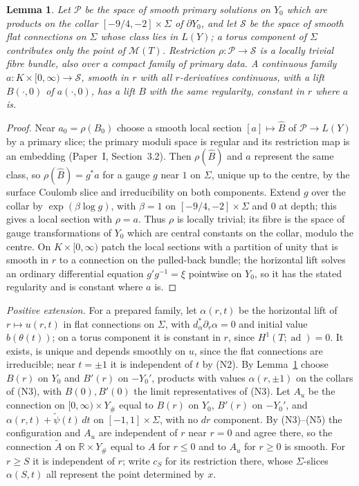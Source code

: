 \documentclass[11pt]{amsart}
\newtheorem{lemma}[theorem]{Lemma}
\theoremstyle{definition}
\theoremstyle{remark}
\theoremstyle{plain}
\numberwithin{equation}{section}
\newcommand{\RR}{\mathbb R}
\newcommand{\ad}{\operatorname{ad}}
\begin{document}
\begin{lemma}\label{lem:representatives}
Let $\mathcal P$ be the space of smooth primary solutions on $Y_0$ which
are products on the collar $[-9/4,-2]\times\Sigma$ of $\partial Y_0$, and let $\mathcal S$ be the
space of smooth flat connections on $\Sigma$ whose class lies in $L(Y)$; a
torus component of $\Sigma$ contributes only the point of $\mathcal M(T)$.
Restriction $\rho:\mathcal P\to\mathcal S$ is a locally trivial fibre bundle,
also over a compact family of primary data. A continuous family
$a:K\times[0,\infty)\to\mathcal S$, smooth in $r$ with all $r$-derivatives
continuous, with a lift $B(\cdot,0)$ of $a(\cdot,0)$, has a lift $B$ with
the same regularity, constant in $r$ where $a$ is.
\end{lemma}
\begin{proof}
Near $a_0=\rho(B_0)$ choose a smooth local section $[a]\mapsto\widehat B$ of
$\mathcal P\to L(Y)$ by a primary slice; the primary moduli space is regular
and its restriction map is an embedding (Paper~I, Section~3.2). Then
$\rho(\widehat B)$ and $a$ represent the same class, so $\rho(\widehat B)=g^*a$
for a gauge $g$ near $1$ on $\Sigma$, unique up to the centre, by the
surface Coulomb slice and irreducibility on both components. Extend $g$
over the collar by $\exp(\beta\log g)$, with $\beta=1$ on
$[-9/4,-2]\times\Sigma$ and $0$ at depth; this gives a local section with $\rho=a$. Thus $\rho$ is
locally trivial; its fibre is the space of gauge transformations of $Y_0$
which are central constants on the collar, modulo the centre. On
$K\times[0,\infty)$ patch the local sections with a partition of unity that
is smooth in $r$ to a connection on the pulled-back bundle; the horizontal
lift solves an ordinary differential equation $g'g^{-1}=\xi$ pointwise on
$Y_0$, so it has the stated regularity and is constant where $a$ is.
\end{proof}

\emph{Positive extension.} For a prepared family, let $\alpha(r,t)$ be the
horizontal lift of $r\mapsto u(r,t)$ in flat connections on $\Sigma$, with
$d^*_{\alpha}\partial_r\alpha=0$ and initial value $b(\theta(t))$; on a torus
component it is constant in $r$, since $H^1(T;\ad)=0$. It exists, is unique
and depends smoothly on $u$, since the flat connections are irreducible;
near $t=\pm1$ it is independent of $t$ by (N2). By
Lemma~\ref{lem:representatives} choose $B(r)$ on $Y_0$ and $B'(r)$ on $-Y_0'$,
products with values $\alpha(r,\pm1)$ on the collars of (N3), with $B(0),B'(0)$
the limit representatives of (N3). Let $A_u$ be the connection on
$[0,\infty)\times Y_\#$ equal to $B(r)$ on $Y_0$, $B'(r)$ on $-Y_0'$, and
$\alpha(r,t)+\widetilde\psi(t)\,dt$ on $[-1,1]\times\Sigma$, with no $dr$
component. By (N3)--(N5) the configuration and $A_u$ are independent of $r$
near $r=0$ and agree there, so the connection $\widetilde A$ on $\RR\times Y_\#$
equal to $A$ for $r\le0$ and to $A_u$ for $r\ge0$ is smooth. For $r\ge S$ it
is independent of $r$; write $c_S$ for its restriction there, whose
$\Sigma$-slices $\alpha(S,t)$ all represent the point determined by $x$.
\end{document}
